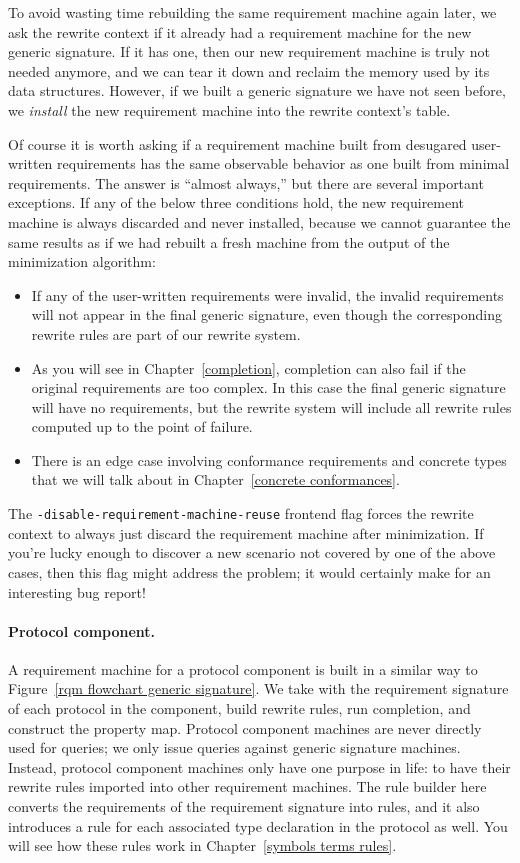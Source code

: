 \documentclass[../generics]{subfiles}
\begin{document}
To avoid wasting time rebuilding the same requirement machine again later, we ask the rewrite context if it already had a requirement machine for the new generic signature. If it has one, then our new requirement machine is truly not needed anymore, and we can tear it down and reclaim the memory used by its data structures. However, if we built a generic signature we have not seen before, we \emph{install} the new requirement machine into the rewrite context's table.

%
Of course it is worth asking if a requirement machine built from desugared user-written requirements has the same observable behavior as one built from minimal requirements. The answer is ``almost always,'' but there are several important exceptions. If any of the below three conditions hold, the new requirement machine is always discarded and never installed, because we cannot guarantee the same results as if we had rebuilt a fresh machine from the output of the minimization algorithm:
\begin{itemize}
\item If any of the user-written requirements were invalid, the invalid requirements will not appear in the final generic signature, even though the corresponding rewrite rules are part of our rewrite system.
\item As you will see in Chapter~\ref{completion}, completion can also fail if the original requirements are too complex. In this case the final generic signature will have no requirements, but the rewrite system will include all rewrite rules computed up to the point of failure.
\item There is an edge case involving conformance requirements and concrete types that we will talk about in Chapter~\ref{concrete conformances}.
\end{itemize}
 The \texttt{-disable-requirement-machine-reuse} frontend flag forces the rewrite context to always just discard the requirement machine after minimization. If you're lucky enough to discover a new scenario not covered by one of the above cases, then this flag might address the problem; it would certainly make for an interesting bug report!

\paragraph{Protocol component.}
%
A requirement machine for a protocol component is built in a similar way to Figure~\ref{rqm flowchart generic signature}. We take with the requirement signature of each protocol in the component, build rewrite rules, run completion, and construct the property map. Protocol component machines are never directly used for queries; we only issue queries against generic signature machines. Instead, protocol component machines only have one purpose in life: to have their rewrite rules imported into other requirement machines.
\eject
The rule builder here converts the requirements of the requirement signature into rules, and it also introduces a rule for each associated type declaration in the protocol as well. You will see how these rules work in Chapter~\ref{symbols terms rules}.
\end{document}
